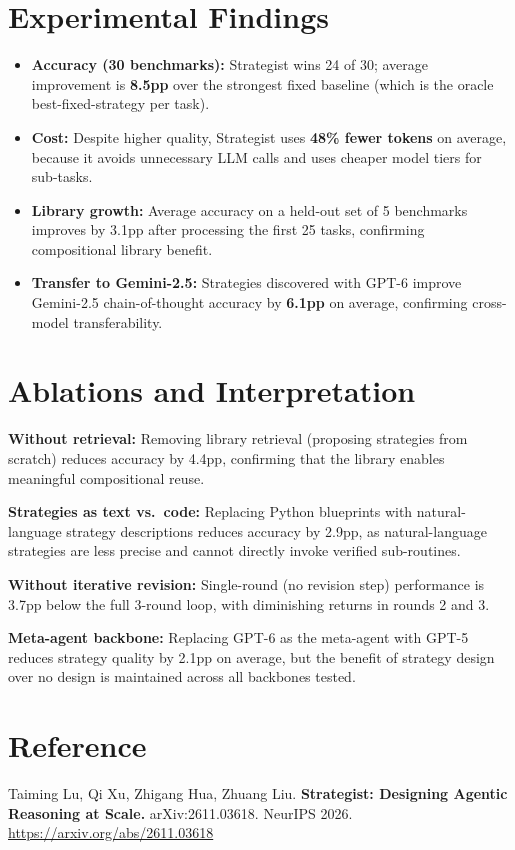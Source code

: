 \documentclass[10pt,twocolumn]{article}
\begin{document}
\section{Experimental Findings}

\begin{itemize}[itemsep=2pt,parsep=0pt]
  \item \textbf{Accuracy (30 benchmarks):} Strategist wins 24 of 30;
    average improvement is \textbf{8.5pp} over the strongest fixed
    baseline (which is the oracle best-fixed-strategy per task).
  \item \textbf{Cost:} Despite higher quality, Strategist uses
    \textbf{48\% fewer tokens} on average, because it avoids
    unnecessary LLM calls and uses cheaper model tiers for sub-tasks.
  \item \textbf{Library growth:} Average accuracy on a held-out set of
    5 benchmarks improves by 3.1pp after processing the first 25 tasks,
    confirming compositional library benefit.
  \item \textbf{Transfer to Gemini-2.5:} Strategies discovered with
    GPT-6 improve Gemini-2.5 chain-of-thought accuracy by \textbf{6.1pp}
    on average, confirming cross-model transferability.
\end{itemize}

\section{Ablations and Interpretation}

\textbf{Without retrieval:} Removing library retrieval (proposing
strategies from scratch) reduces accuracy by 4.4pp, confirming that
the library enables meaningful compositional reuse.

\textbf{Strategies as text vs.\ code:} Replacing Python blueprints with
natural-language strategy descriptions reduces accuracy by 2.9pp, as
natural-language strategies are less precise and cannot directly invoke
verified sub-routines.

\textbf{Without iterative revision:} Single-round (no revision step)
performance is 3.7pp below the full 3-round loop, with diminishing
returns in rounds 2 and 3.

\textbf{Meta-agent backbone:} Replacing GPT-6 as the meta-agent with
GPT-5 reduces strategy quality by 2.1pp on average, but the benefit of
strategy design over no design is maintained across all backbones tested.

\section*{Reference}

Taiming Lu, Qi Xu, Zhigang Hua, Zhuang Liu.
\textbf{Strategist: Designing Agentic Reasoning at Scale.}
arXiv:2611.03618. NeurIPS 2026.
\url{https://arxiv.org/abs/2611.03618}
\end{document}
